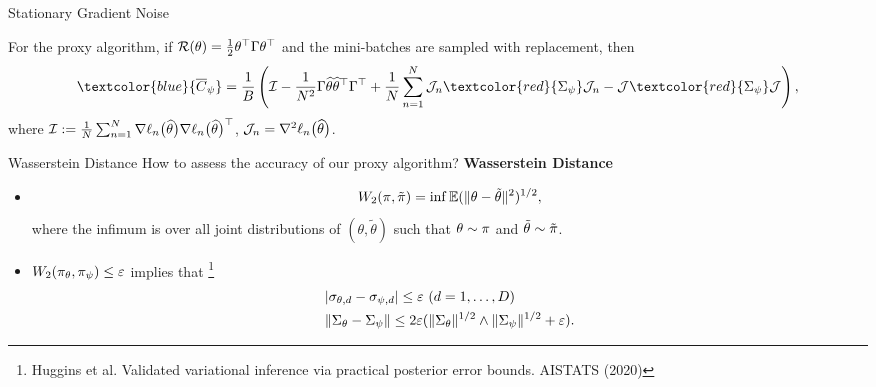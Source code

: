\documentclass[10pt,xcolor=table]{beamer}
\begin{document}
\begin{frame}{Stationary Gradient Noise}
	\begin{theorem} \label{theorem: general case covariance matrix of noise}
		For the proxy algorithm, if $\mathcal{R}(\theta) = \frac{1}{2} \theta^{\top}\Gamma \theta^{\top}$ and the mini-batches
		are sampled with replacement, then 
		\begin{equation*}
			\label{eq: covariance of stationary noise}
			\begin{aligned}
				\textcolor{blue}{\overline{C}_{\psi}} =\frac{1}{B} \left( \mathcal{I} - \frac{1}{N^{2}} \Gamma \MLE \MLE^{\top} \Gamma^{\top} + \frac{1}{N} \sum_{n=1}^{N} \mathcal{J}_{n} \textcolor{red}{\Sigma_{\psi}} \mathcal{J}_{n} -  \mathcal{J} \textcolor{red}{\Sigma_{\psi}} \mathcal{J} \right),
			\end{aligned} 
		\end{equation*}
		where $\mathcal{I} :=  \frac{1}{N} \sum_{n=1}^{N} \nabla\ell_{n}\bigl(\widehat{\theta}\bigr) \nabla\ell_{n}\bigl(\widehat{\theta}\bigr)^{\top}$, $\mathcal{J}_{n} = \nabla^{2}\ell_{n}\bigl(\widehat{\theta}\bigr)$.
	\end{theorem}
\end{frame}

\begin{frame}{Wasserstein Distance}
How to assess the accuracy of our proxy algorithm? \textbf{Wasserstein Distance}
\begin{itemize}
\item \[
W_{2}(\pi, \tilde\pi) = \inf \mathbb{E}(\lVert\theta - \tilde\theta\rVert^{2})^{1/2},
\]
where the infimum is over all joint distributions of $(\theta, \tilde\theta)$ such that $\theta \sim \pi$ and $\tilde\theta \sim \tilde\pi$. 
\item $W_{2}(\pi_{\theta}, \pi_{\psi}) \leq \varepsilon$ implies that \footnote{Huggins et al. Validated variational inference via practical posterior error bounds. AISTATS (2020)}
\begin{equation*}
	\begin{aligned}
		&\label{eq:general-stdev-and-cov-error-bounds}
		|\sigma_{\theta,d} - \sigma_{\psi,d}| \leq \varepsilon~(d = 1,\dots,D) \\
		&\lVert\Sigma_{\theta} - \Sigma_{\psi}\rVert \le 2 \varepsilon (\lVert\Sigma_{\theta}\rVert^{1/2} \wedge \lVert\Sigma_{\psi}\rVert^{1/2} + \varepsilon).
	\end{aligned}
\end{equation*}
\end{itemize}
\end{frame}
\end{document}
